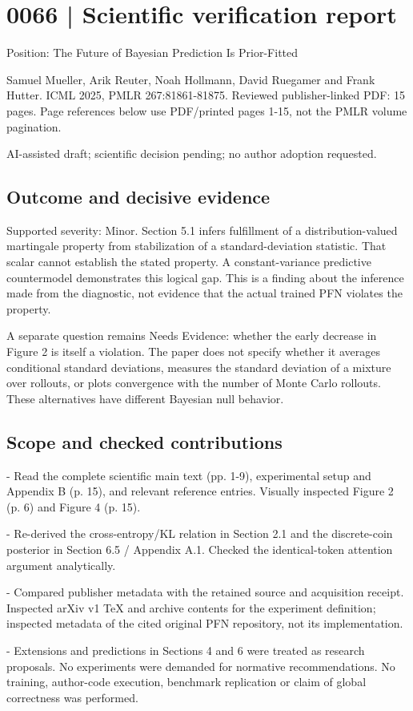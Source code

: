 \documentclass[10pt]{article}
\begin{document}
\section*{0066 | Scientific verification report}
Position: The Future of Bayesian Prediction Is Prior-Fitted\par
Samuel Mueller, Arik Reuter, Noah Hollmann, David Ruegamer and Frank Hutter. ICML 2025, PMLR 267:81861-81875. Reviewed publisher-linked PDF: 15 pages. Page references below use PDF/printed pages 1-15, not the PMLR volume pagination.\par
AI-assisted draft; scientific decision pending; no author adoption requested.\par
\subsection*{Outcome and decisive evidence}
Supported severity: Minor. Section 5.1 infers fulfillment of a distribution-valued martingale property from stabilization of a standard-deviation statistic. That scalar cannot establish the stated property. A constant-variance predictive countermodel demonstrates this logical gap. This is a finding about the inference made from the diagnostic, not evidence that the actual trained PFN violates the property.\par
A separate question remains Needs Evidence: whether the early decrease in Figure 2 is itself a violation. The paper does not specify whether it averages conditional standard deviations, measures the standard deviation of a mixture over rollouts, or plots convergence with the number of Monte Carlo rollouts. These alternatives have different Bayesian null behavior.\par
\subsection*{Scope and checked contributions}
- Read the complete scientific main text (pp. 1-9), experimental setup and Appendix B (p. 15), and relevant reference entries. Visually inspected Figure 2 (p. 6) and Figure 4 (p. 15).\par
- Re-derived the cross-entropy/KL relation in Section 2.1 and the discrete-coin posterior in Section 6.5 / Appendix A.1. Checked the identical-token attention argument analytically.\par
- Compared publisher metadata with the retained source and acquisition receipt. Inspected arXiv v1 TeX and archive contents for the experiment definition; inspected metadata of the cited original PFN repository, not its implementation.\par
- Extensions and predictions in Sections 4 and 6 were treated as research proposals. No experiments were demanded for normative recommendations. No training, author-code execution, benchmark replication or claim of global correctness was performed.\par
\end{document}
